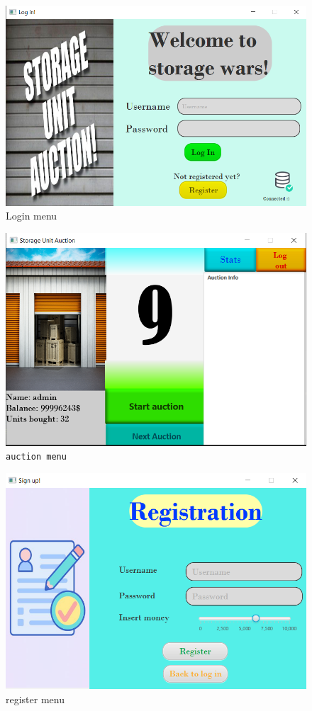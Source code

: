 \documentclass[
]{report}
\begin{document}
\begin{figure}
\centering
\includegraphics{images/title.png}
\caption{Login menu}
\end{figure}

\begin{figure}
\centering
\includegraphics{images/auction_picture.png}
\caption{\texttt{auction\ menu}}
\end{figure}

\begin{figure}
\centering
\includegraphics{images/registration.png}
\caption{register menu}
\end{figure}
\end{document}
